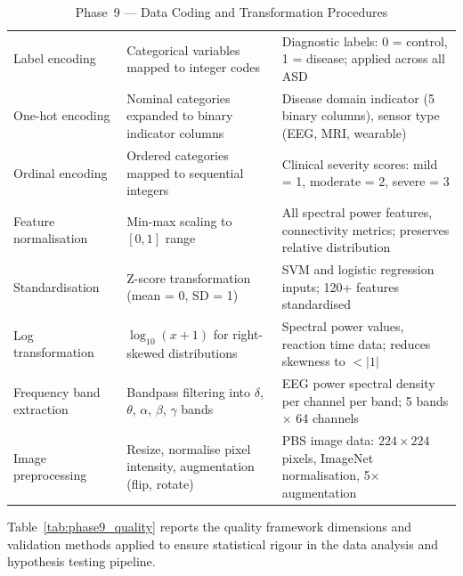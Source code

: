 \begingroup\singlespacing\tablefontsize\tablestripes
\begin{xltabular}{\textwidth}{@{} l X X @{}}
\caption{Phase~9 --- Data Coding and Transformation Procedures}
\label{tab:phase9_coding}\\
\toprule
{} &  &  \\
\midrule
\endfirsthead
\endhead
\bottomrule
\endlastfoot
Label encoding          & Categorical variables mapped to integer codes                  & Diagnostic labels: 0 = control, 1 = disease; applied across all ASD \\
\addlinespace
One-hot encoding        & Nominal categories expanded to binary indicator columns        & Disease domain indicator (5 binary columns), sensor type (EEG, MRI, wearable) \\
\addlinespace
Ordinal encoding        & Ordered categories mapped to sequential integers               & Clinical severity scores: mild = 1, moderate = 2, severe = 3 \\
\addlinespace
Feature normalisation   & Min-max scaling to $[0, 1]$ range                             & All spectral power features, connectivity metrics; preserves relative distribution \\
\addlinespace
Standardisation         & Z-score transformation (mean = 0, SD = 1)                     & SVM and logistic regression inputs; 120+ features standardised \\
\addlinespace
Log transformation      & $\log_{10}(x + 1)$ for right-skewed distributions             & Spectral power values, reaction time data; reduces skewness to $< |1|$ \\
\addlinespace
Frequency band extraction & Bandpass filtering into $\delta$, $\theta$, $\alpha$, $\beta$, $\gamma$ bands & EEG power spectral density per channel per band; 5 bands $\times$ 64 channels \\
\addlinespace
Image preprocessing     & Resize, normalise pixel intensity, augmentation (flip, rotate) & PBS image data: $224 \times 224$ pixels, ImageNet normalisation, 5$\times$ augmentation \\
\end{xltabular}
\endgroup

\vspace{1.5em}

Table~\ref{tab:phase9_quality} reports the quality framework dimensions and validation methods applied to ensure statistical rigour in the data analysis and hypothesis testing pipeline.

